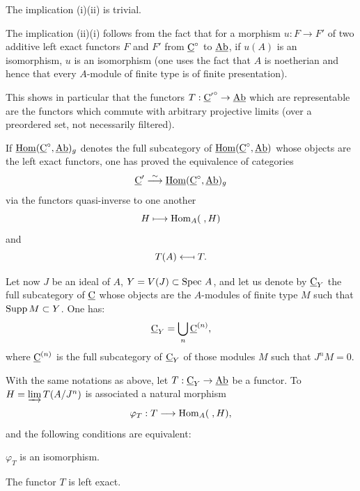 The implication (i)\ALORS (ii) is trivial.

The implication (ii)\ALORS (i) follows from the fact that for a morphism $u:F\to F'$ of two additive left exact functors $F$ and $F'$ from $\underline{\mathrm{C}}^{\circ}$ to $\underline{\mathrm{Ab}}$, if $u(A)$ is an isomorphism, $u$ is an isomorphism (one uses the fact that $A$ is noetherian and hence that every $A$-module of finite type is of finite presentation).

\begin{remark} \label{IV.1.2}
This shows in particular that the functors $T:{\ccat'}^{\circ}\to \Ab$ which are representable are the functors which commute with arbitrary projective limits (over a preordered set, not necessarily filtered).
\end{remark}

If $\operatorname{\underline{Hom}} (\underline{\mathrm{C}}^{\circ}, \underline{\mathrm{Ab}})_{g}$ denotes the full subcategory of $\operatorname{\underline{Hom}} (\underline{\mathrm{C}}^{\circ}, \underline{\mathrm{Ab}})$ whose objects are the left exact functors, one has proved the equivalence of categories
\[
\underline{\mathrm{C}}' \overset{\sim}{\longrightarrow} \operatorname{\underline{Hom}} (\underline{\mathrm{C}}^{\circ}, \underline{\mathrm{Ab}})_{g}
\]
via the functors quasi-inverse to one another
\[
H \mto\Hom_{A}(\;, H)
\]
and
\[
T(A) \mfrom T.
\]

Let now $J$ be an ideal of $A$, $Y=V(J)\subset \operatorname{Spec}\, A$, and let us denote by $\underline{\mathrm{C}}_{Y}$ the full subcategory of $\underline{\mathrm{C}}$ whose objects are the $A$-modules of finite type $M$ such that $\operatorname{Supp} M\subset Y$. One has:
\[
\underline{\mathrm{C}}_{Y}=\bigcup_{n}\underline{\mathrm{C}}^{(n)},
\]
where $\underline{\mathrm{C}}^{(n)}$ is the full subcategory of $\underline{\mathrm{C}}_{Y}$ of those modules $M$ such that $J^{n}M=0$.

\begin{proposition} \label{IV.1.3}
With the same notations as above, let $T:\ccat_{Y}\to \Ab$ be a functor. To $H=\varinjlim T(A/J^n)$ is associated a natural morphism
\[
\varphi_{T}: T\to \Hom_{A}(\;, H),
\]
and the following conditions are equivalent:
\begin{enumeratei}
\item
$\varphi_{T}$ is an isomorphism.

\item
The functor $T$ is left exact.
\end{enumeratei}
\end{proposition}

